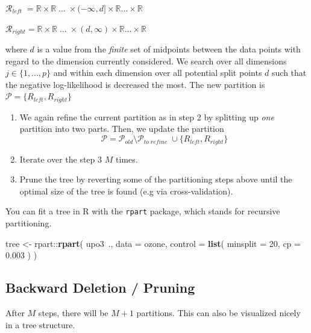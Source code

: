 \documentclass[]{book}
\newenvironment{Shaded}{\begin{snugshade}}{\end{snugshade}}
\newcommand{\KeywordTok}[1]{\textcolor[rgb]{0.13,0.29,0.53}{\textbf{{#1}}}}
\newcommand{\DataTypeTok}[1]{\textcolor[rgb]{0.13,0.29,0.53}{{#1}}}
\newcommand{\DecValTok}[1]{\textcolor[rgb]{0.00,0.00,0.81}{{#1}}}
\newcommand{\FloatTok}[1]{\textcolor[rgb]{0.00,0.00,0.81}{{#1}}}
\newcommand{\StringTok}[1]{\textcolor[rgb]{0.31,0.60,0.02}{{#1}}}
\newcommand{\NormalTok}[1]{{#1}}
\providecommand{\tightlist}{%
  \setlength{\itemsep}{0pt}\setlength{\parskip}{0pt}}
\begin{document}
\(\mathcal{R}_{left} \;= \mathbb{R}\times\mathbb{R}\;...\; \times(-\infty, d]\times  \mathbb{R} ...\times\mathbb{R}\)

\(\mathcal{R}_{right} = \mathbb{R}\times\mathbb{R}\;...\; \times(d, \infty)\times  \mathbb{R} ...\times\mathbb{R}\)

where \(d\) is a value from the \emph{finite} set of midpoints between
the data points with regard to the dimension currently considered. We
search over all dimensions \(j \in \{1, ..., p\}\) and within each
dimension over all potential split points \(d\) such that the negative
log-likelihood is decreased the most. The new partition is
\(\mathcal{P} = \{R_{left}, R_{right}\}\)

\begin{enumerate}
\def\labelenumi{\arabic{enumi}.}
\setcounter{enumi}{2}
\tightlist
\item
  We again refine the current partition as in step 2 by splitting up
  \emph{one} partition into two parts. Then, we update the partition
  \[\mathcal{P} = \mathcal{P}_{old} \setminus \mathcal{P}_{to\;refine} \;\cup\{R_{left}, R_{right}\} \]
\item
  Iterate over the step 3 \(M\) times.
\item
  Prune the tree by reverting some of the partitioning steps above until
  the optimal size of the tree is found (e.g via cross-validation).
\end{enumerate}

You can fit a tree in R with the \texttt{rpart} package, which stands
for recursive partitioning.

\begin{Shaded}
\begin{Highlighting}[]
\NormalTok{tree <-}\StringTok{ }\NormalTok{rpart::}\KeywordTok{rpart}\NormalTok{(}
  \NormalTok{upo3~., }
  \DataTypeTok{data =} \NormalTok{ozone,}
  \DataTypeTok{control =} \KeywordTok{list}\NormalTok{(}
    \DataTypeTok{minsplit =} \DecValTok{20}\NormalTok{,}
    \DataTypeTok{cp =} \FloatTok{0.003}
  \NormalTok{)}
\NormalTok{)}
\end{Highlighting}
\end{Shaded}

\subsection{Backward Deletion /
Pruning}\label{backward-deletion-pruning}

After \(M\) steps, there will be \(M + 1\) partitions. This can also be
visualized nicely in a tree structure.
\end{document}
